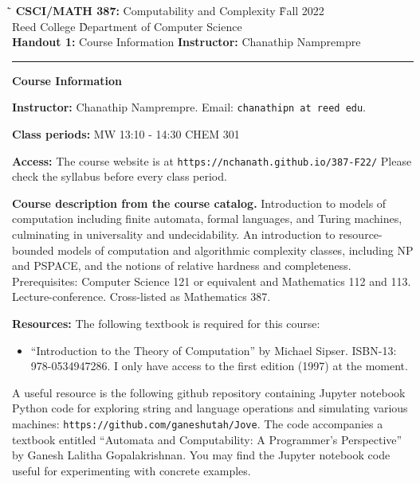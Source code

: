 \documentclass{article}
\newcommand{\bheading}[1]{\vspace{10pt} \noindent \textbf{#1}}
\begin{document}


\begin{tabbing}
  \`\=\kill
  \textbf{CSCI/MATH 387:} Computability and Complexity \` Fall 2022 \\
  Reed College \` Department of Computer Science \\
  \textbf{Handout 1:} Course Information \` \textbf{Instructor:} Chanathip Namprempre
\end{tabbing}


\hrule

\vspace{.25in}

\begin{center}
\textbf{\Large Course Information}
\end{center}
\vspace{.2in}

\bheading{Instructor:} Chanathip Namprempre. Email: \texttt{chanathipn at reed edu}.

\bheading{Class periods:} MW 13:10 - 14:30 CHEM 301 

\bheading{Access:} The course website is at \texttt{https://nchanath.github.io/387-F22/} Please check the syllabus before every class period.

\bheading{Course description from the course catalog.} Introduction to models of computation including finite automata, formal languages, and Turing machines, culminating in universality and undecidability. An introduction to resource-bounded models of computation and algorithmic complexity classes, including NP and PSPACE, and the notions of relative hardness and completeness. Prerequisites: Computer Science 121 or equivalent and Mathematics 112 and 113. Lecture-conference. Cross-listed as Mathematics 387. 


\bheading{Resources:} The following textbook is required for this course:
\begin{itemize}
  \item ``Introduction to the Theory of Computation'' by Michael Sipser. ISBN-13: 978-0534947286. I only have access to the first edition (1997) at the moment.
\end{itemize}
A useful resource is the following github repository containing Jupyter notebook Python code for exploring string and language operations and simulating various machines: \texttt{https://github.com/ganeshutah/Jove}. The code accompanies a textbook entitled ``Automata and Computability: A Programmer's Perspective'' by Ganesh Lalitha Gopalakrishnan. You may find the Jupyter notebook code useful for experimenting with concrete examples.
\end{document}
